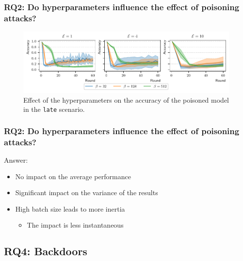 \documentclass[color,t,presentation,english,aspectratio=169]{beamer}
\begin{document}
\begin{frame}
	\frametitle{RQ2: Do hyperparameters influence the effect of poisoning attacks?}

	\begin{figure}
		\centering
		\includegraphics[width=\textwidth]{figures/hyperparams-late.pdf}
		\caption{Effect of the hyperparameters on the accuracy of the poisoned model in the \texttt{late} scenario.}
	\end{figure}
\end{frame}


\begin{frame}
\frametitle{RQ2: Do hyperparameters influence the effect of poisoning attacks?}

Answer:
\begin{itemize}
	\item No impact on the average performance
	\item Significant impact on the variance of the results
	\item High batch size leads to more inertia
	\begin{itemize}
		\item The impact is less instantaneous
	\end{itemize}
\end{itemize}
\end{frame}

\subsection{RQ4: Backdoors}
\end{document}
